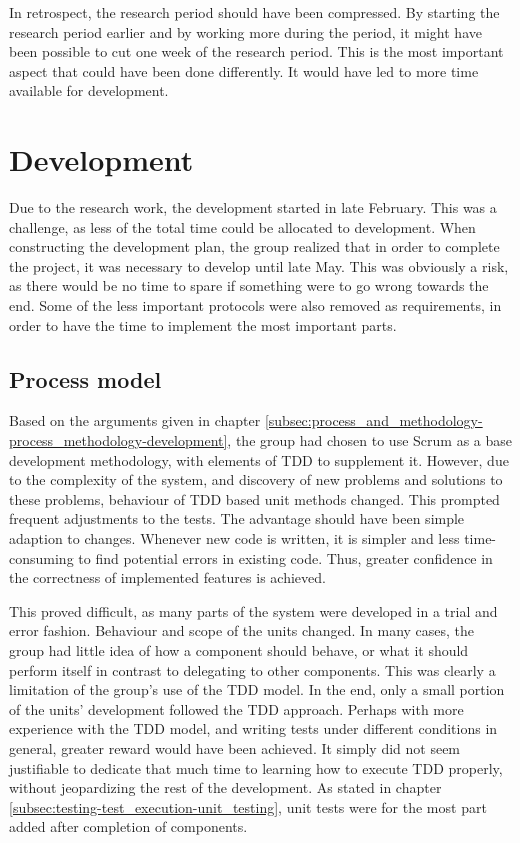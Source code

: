 In retrospect, the research period should have been compressed. By starting the research period earlier and by working more during the period, it might have been possible to cut one week of the research period. This is the most important aspect that could have been done differently. It would have led to more time available for development.

\section{Development}
\label{sec:project_evaluation-development}

Due to the research work, the development started in late February. This was a challenge, as less of the total time could be allocated to development. When constructing the development plan, the group realized that in order to complete the project, it was necessary to develop until late May. This was obviously a risk, as there would be no time to spare if something were to go wrong towards the end. Some of the less important protocols were also removed as requirements, in order to have the time to implement the most important parts.

\subsection{Process model}
\label{subsec:project_evaluation-development-process_model}

Based on the arguments given in chapter \ref{subsec:process_and_methodology-process_methodology-development}, the group had chosen to use Scrum as a base development methodology, with elements of TDD to supplement it. However, due to the complexity of the system, and discovery of new problems and solutions to these problems, behaviour of TDD based unit methods changed. This prompted frequent adjustments to the tests. The advantage should have been simple adaption to changes. Whenever new code is written, it is simpler and less time-consuming to find potential errors in existing code. Thus, greater confidence in the correctness of implemented features is achieved.

This proved difficult, as many parts of the system were developed in a trial and error fashion. Behaviour and scope of the units changed. In many cases, the group had little idea of how a component should behave, or what it should perform itself in contrast to delegating to other components. This was clearly a limitation of the group's use of the TDD model. In the end, only a small portion of the units' development followed the TDD approach. Perhaps with more experience with the TDD model, and writing tests under different conditions in general, greater reward would have been achieved. It simply did not seem justifiable to dedicate that much time to learning how to execute TDD properly, without jeopardizing the rest of the development. As stated in chapter \ref{subsec:testing-test_execution-unit_testing}, unit tests were for the most part added after completion of components.

